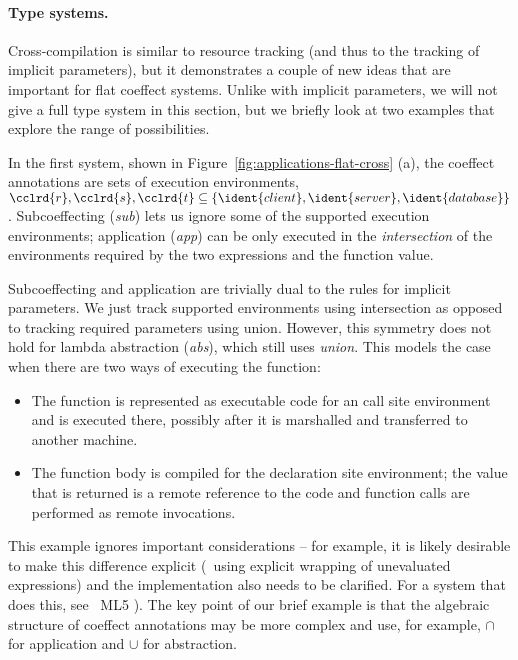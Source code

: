 \paragraph{Type systems.}

Cross-compilation is similar to resource tracking (and thus to the tracking of implicit
parameters), but it demonstrates a couple of new ideas that are important for flat coeffect
systems. Unlike with implicit parameters, we will not give a full type system in this
section, but we briefly look at two examples that explore the range of possibilities.

In the first system, shown in Figure~\ref{fig:applications-flat-cross} (a), the coeffect annotations
are sets of execution environments, \ie~$\cclrd{r}, \cclrd{s}, \cclrd{t} \subseteq \{ \ident{client},
\ident{server}, \ident{database} \}$. Subcoeffecting (\emph{sub}) lets us ignore some of the supported
execution environments; application (\emph{app}) can be only executed in the \emph{intersection} of the
environments required by the two expressions and the function value.

Subcoeffecting and application are trivially dual to the rules for implicit parameters. We just track
supported environments using intersection as opposed to tracking required parameters using union.
However, this symmetry does not hold for lambda abstraction (\emph{abs}), which still uses \emph{union}.
This models the case when there are two ways of executing the function:
%
\begin{itemize}
\item The function is represented as executable code for an call site environment
  and is executed there, possibly after it is marshalled and transferred to another machine.
\vspace{-0.5em}
\item The function body is compiled for the declaration site environment; the value
  that is returned is a remote reference to the code and function calls are performed as remote invocations.
\end{itemize}
%
This example ignores important considerations -- for example, it is likely desirable to make this
difference explicit (\eg~using explicit wrapping of unevaluated expressions) and the implementation
also needs to be clarified. For a system that does this, see \eg~ML5 \cite{app-distributed-ml5}).
The key point of our brief example is that the algebraic structure of coeffect annotations may be more
complex and use, for example, $\cap$ for application and $\cup$ for abstraction.

